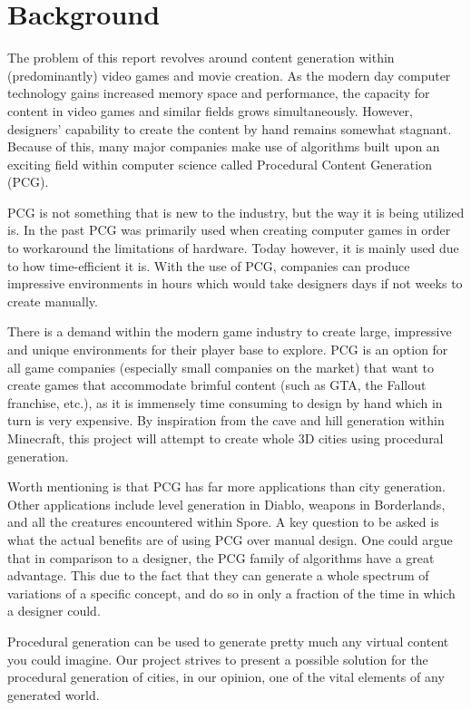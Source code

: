 \section{Background}
The problem of this report revolves around content generation within (predominantly) video games and movie creation. 
As the modern day computer technology gains increased memory space and performance, the capacity for content in video games and similar fields grows simultaneously. 
However, designers' capability to create the content by hand remains somewhat stagnant.
Because of this, many major companies make use of algorithms built upon an exciting field within computer science called Procedural Content Generation (PCG). 

PCG is not something that is new to the industry, but the way it is being utilized is.
In the past PCG was primarily used when creating computer games  in order to workaround the limitations of hardware.
Today however, it is mainly used due to how time-efficient it is. 
With the use of PCG, companies can produce impressive environments in hours which would take designers days if not weeks to create manually.

There is a demand within the modern game industry to create large, impressive and unique environments for their player base to explore. 
PCG is an option for all game companies (especially small companies on the market) that want to create games that accommodate brimful content (such as GTA, the Fallout franchise, etc.), as it is immensely time consuming to design by hand which in turn is very expensive. 
By inspiration from the cave and hill generation within Minecraft, this project will attempt to create whole 3D cities using procedural generation. 

Worth mentioning is that PCG has far more applications than city generation.
Other applications include level generation in Diablo, weapons in Borderlands, and all the creatures encountered within Spore.
A key question to be asked is what the actual benefits are of using PCG over manual design. 
One could argue that in comparison to a designer, the PCG family of algorithms have a great advantage. This due to the fact that they can generate a whole spectrum of variations of a specific concept, and do so in only a fraction of the time in which a designer could. 

Procedural generation can be used to generate pretty much any virtual content you could imagine. 
Our project strives to present a possible solution for the procedural generation of cities, in our opinion, one of the vital elements of any generated world. 






